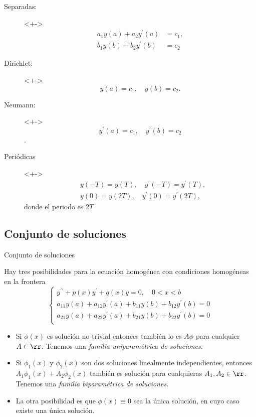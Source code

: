 \begin{description}
 \item[Separadas:]<+->
 \[\begin{split}
    a_{1} y(a)+a_{2} y^{\prime}(a)&=c_{1},\\
    b_{1} y(b)+b_{2} y^{\prime}(b)&=c_{2}
   \end{split}
\]
\item[Dirichlet:]<+-> $$y(a)=c_{1},\quad y(b)=c_{2} .$$
\item[Neumann:]<+-> $$y^{\prime}(a)=c_{1},\quad y^{\prime}(b)=c_{2}$$.
\item[Periódicas]<+-> 
$$
\begin{aligned}
&y(-T)=y(T), \quad y^{\prime}(-T)=y^{\prime}(T), \\
&y(0)=y(2 T), \quad y^{\prime}(0)=y^{\prime}(2 T),
\end{aligned}
$$
donde el periodo es $2 T$
\end{description}



\subsection{Conjunto de soluciones}

{Conjunto de soluciones}

Hay tres posibilidades para la ecuación homogénea con condiciones homogéneas en la frontera
\[
 \left\{
        \begin{array}{l}
            y^{\prime \prime}+p(x) y^{\prime}+q(x) y=0, \quad 0<x<b\\
            a_{11} y(a)+a_{12} y^{\prime}(a)+b_{11} y(b)+b_{12} y^{\prime}(b)=0\\
            a_{21} y(a)+a_{22} y^{\prime}(a)+b_{21} y(b)+b_{22} y^{\prime}(b)=0\\ 
         \end{array}
 \right.
\]

\begin{itemize}


\item Si $\phi(x)$ es solución no trivial  entonces también lo es $A \phi$ para cualquier  $A\in\rr$. Tenemos una \emph{familia uniparamétrica de soluciones}.


\item Si $\phi_{1}(x)$ y $\phi_{2}(x)$ son  dos soluciones linealmente independientes, entonces $A_{1} \phi_{1}(x)+A_{2} \phi_{2}(x)$ también es solución para cualquieras  $A_{1}, A_{2}\in\rr$. Tenemos una \emph{familia biparamétrica de soluciones}.


\item La otra posibilidad es que $\phi(x) \equiv 0$ sea la única solución, en cuyo caso existe una única solución. 

\end{itemize} 

